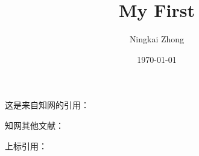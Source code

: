 \documentclass{article}
\title{My First}
\author{Ningkai Zhong}
\date{\today}
\begin{document}
\maketitle
这是来自知网的引用： \cite{jishixing}

知网其他文献： \cite{jiqiren}

上标引用： \cite{jiyuhe}

\printbibliography[title=参考文献]
\end{document}
